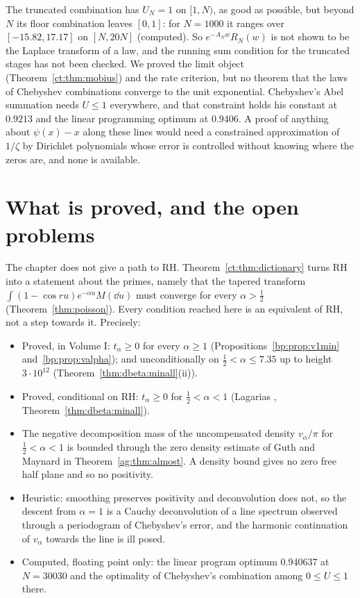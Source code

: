 \begin{remark}
The truncated combination has $U_N=1$ on $[1,N)$, as good as possible, but beyond $N$ its floor combination leaves $[0,1]$: for $N=1000$ it ranges over $[-15.82,17.17]$ on $[N,20N]$ (computed). So $e^{-A_Nw}R_N(w)$ is not shown to be the Laplace transform of a law, and the running sum condition for the truncated stages has not been checked. We proved the limit object (Theorem~\ref{ct:thm:mobius}) and the rate criterion, but no theorem that the laws of Chebyshev combinations converge to the unit exponential. Chebyshev's Abel summation needs $U\le1$ everywhere, and that constraint holds his constant at $0.9213$ and the linear programming optimum at $0.9406$. A proof of anything about $\psi(x)-x$ along these lines would need a constrained approximation of $1/\zeta$ by Dirichlet polynomials whose error is controlled without knowing where the zeros are, and none is available.
\end{remark}

\section{What is proved, and the open problems}\label{ct:sec:path}

The chapter does not give a path to RH. Theorem~\ref{ct:thm:dictionary} turns RH into a statement about the primes, namely that the tapered transform $\int(1-\cos ru)e^{-\alpha u}M(\dd u)$ must converge for every $\alpha>\frac12$ (Theorem~\ref{thm:poisson}). Every condition reached here is an equivalent of RH, not a step towards it. Precisely:
\begin{itemize}
\item Proved, in Volume I: $t_\alpha\ge0$ for every $\alpha\ge1$ (Propositions~\ref{bp:prop:v1min} and~\ref{bp:prop:valpha}); and unconditionally on $\frac12<\alpha\le7.35$ up to height $3\cdot10^{12}$ (Theorem~\ref{thm:dbeta:minall}(ii)).
\item Proved, conditional on RH: $t_\alpha\ge0$ for $\frac12<\alpha<1$ (Lagarias \cite{Lagarias}, Theorem~\ref{thm:dbeta:minall}).
\item The negative decomposition mass of the uncompensated density $v_\alpha/\pi$ for $\frac12<\alpha<1$ is bounded through the zero density estimate of Guth and Maynard \cite{GM26} in Theorem~\ref{ag:thm:almost}. A density bound gives no zero free half plane and so no positivity.
\item Heuristic: smoothing preserves positivity and deconvolution does not, so the descent from $\alpha=1$ is a Cauchy deconvolution of a line spectrum observed through a periodogram of Chebyshev's error, and the harmonic continuation of $v_\alpha$ towards the line is ill posed.
\item Computed, floating point only: the linear program optimum $0.940637$ at $N=30030$ and the optimality of Chebyshev's combination among $0\le U\le1$ there.
\end{itemize}

